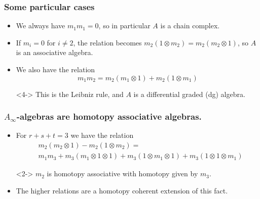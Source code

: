 \documentclass{beamer}
\theoremstyle{definition}
\begin{document}
\begin{frame}
\frametitle{Some particular cases}
\begin{itemize}
\item<1-> We always have $m_1m_1=0$, so in particular $A$ is a chain complex.%
\item<2-> If $m_i=0$ for $i\neq 2$, the relation becomes $m_2(1\otimes m_2)=m_2(m_2\otimes 1)$, so $A$ is an associative algebra.
\item<3->  We also have the relation \[m_1m_2=m_2(m_1\otimes 1)+m_2(1\otimes m_1)\]%
\item[]<4-> This is the Leibniz rule, and $A$ is a differential graded (dg) algebra.
\end{itemize}
\end{frame}


\begin{frame}
\frametitle{$A_\infty$-algebras are homotopy associative algebras.}
\begin{itemize}
\item<1-> For $r+s+t=3$ we have the relation
\begin{align*}
&m_2(m_2\otimes 1)-m_2(1\otimes m_2)=\\ %
&m_1m_3+m_3(m_1\otimes 1\otimes 1)+m_3(1\otimes m_1\otimes 1)+m_3(1\otimes 1\otimes m_1)
\end{align*}
\item[]<2-> $m_2$ is homotopy associative with homotopy given by $m_3$. %
\item<3-> The higher relations are a homotopy coherent extension of this fact. %
\end{itemize}
\end{frame}
\end{document}
